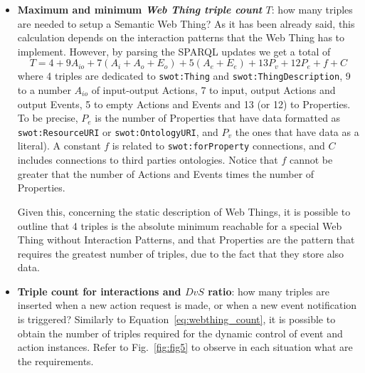 \begin{itemize}
    \item \textbf{Maximum and minimum \textit{Web Thing triple count} $T$}: how many triples are needed to setup a Semantic Web Thing? As it has been already said, this calculation depends on the interaction patterns that the Web Thing has to implement. However, by parsing the SPARQL updates we get a total of
    \begin{equation}
T = 4+9A_{io}+7(A_i+A_o+E_o)+5(A_e+E_e)+13P_v+12P_e+f+C
        \label{eq:webthing_count}
    \end{equation}
    where 4 triples are dedicated to \texttt{swot:Thing} and \texttt{swot:ThingDescription}, 9 to a number $A_{io}$ of input-output Actions, 7 to input, output Actions and output Events, 5 to empty Actions and Events and 13 (or 12) to Properties. To be precise, $P_e$ is the number of Properties that have data formatted as \texttt{swot:ResourceURI} or \texttt{swot:OntologyURI}, and $P_v$ the ones that have data as a literal). A constant $f$ is related to \texttt{swot:forProperty} connections, and $C$ includes connections to third parties ontologies. Notice that $f$ cannot be greater that the number of Actions and Events times the number of Properties.
    
    Given this, concerning the static description of Web Things, it is possible to outline that 4 triples is the absolute minimum reachable for a special Web Thing without Interaction Patterns, and that Properties are the pattern that requires the greatest number of triples, due to the fact that they store also data. 
    
    
    \item \textbf{Triple count for interactions and $DvS$ ratio}: how many triples are inserted when a new action request is made, or when a new event notification is triggered? Similarly to Equation~\ref{eq:webthing_count}, it is possible to obtain the number of triples required for the dynamic control of event and action instances. Refer to Fig.~\ref{fig:fig5} to observe in each situation what are the requirements. 
    

\end{itemize}
